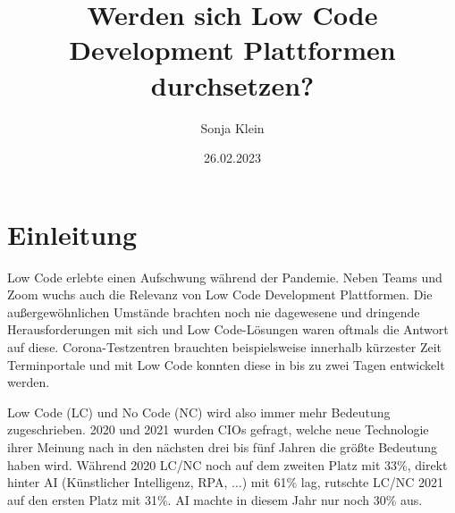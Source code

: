 \documentclass[12pt]{article} %
\title{Werden sich Low Code Development Plattformen durchsetzen?}
\author{Sonja Klein}
\date{26.02.2023}
\begin{document}

	
	\maketitle	
	\newpage
	\tableofcontents
	\newpage
	
	\section{Einleitung}
	Low Code erlebte einen Aufschwung während der Pandemie. Neben Teams und Zoom wuchs auch die Relevanz von Low Code Development Plattformen. Die außergewöhnlichen Umstände brachten noch nie dagewesene und dringende Herausforderungen mit sich und Low Code-Lösungen waren oftmals die Antwort auf diese. Corona-Testzentren brauchten beispielsweise innerhalb kürzester Zeit Terminportale und mit Low Code konnten diese in bis zu zwei Tagen entwickelt werden. \autocite{AmyGlasscock.2021} \newline 
	
	Low Code (LC) und No Code (NC) wird also immer mehr Bedeutung zugeschrieben. 2020 und 2021 wurden CIOs gefragt, welche neue Technologie ihrer Meinung nach in den nächsten drei bis fünf Jahren die größte Bedeutung haben wird. Während 2020 LC/NC noch auf dem zweiten Platz mit 33\%, direkt hinter AI (Künstlicher Intelligenz, RPA, ...) mit 61\% lag, rutschte LC/NC 2021 auf den ersten Platz mit 31\%. AI machte in diesem Jahr nur noch 30\% aus. \autocite{AmyGlasscock.2021}
	
\end{document}
